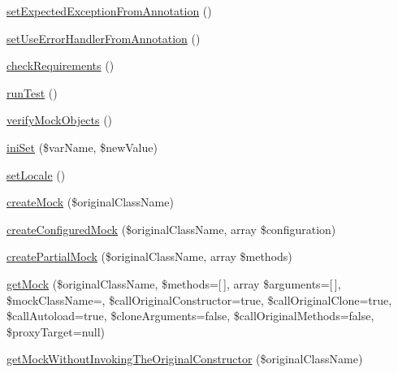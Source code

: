 \begin{DoxyCompactItemize}
\item 
\mbox{\hyperlink{class_p_h_p_unit___framework___test_case_a1f8d27bd497682c5865d7cd56637107d}{set\+Expected\+Exception\+From\+Annotation}} ()
\item 
\mbox{\hyperlink{class_p_h_p_unit___framework___test_case_aa5e8cbdf33dc3eea4fbd698aeb198dc1}{set\+Use\+Error\+Handler\+From\+Annotation}} ()
\item 
\mbox{\hyperlink{class_p_h_p_unit___framework___test_case_a675519dd67770964b90eddec9f8abe09}{check\+Requirements}} ()
\item 
\mbox{\hyperlink{class_p_h_p_unit___framework___test_case_ad2541a093be4d619db04ed65d661a684}{run\+Test}} ()
\item 
\mbox{\hyperlink{class_p_h_p_unit___framework___test_case_a11e8b1ce7043340e31f0fd2c59ee35c6}{verify\+Mock\+Objects}} ()
\item 
\mbox{\hyperlink{class_p_h_p_unit___framework___test_case_a82d7151b3bd880686e79a66c5baa583d}{ini\+Set}} (\$var\+Name, \$new\+Value)
\item 
\mbox{\hyperlink{class_p_h_p_unit___framework___test_case_a7b8ab0275f921bf96c37f4412a9d6020}{set\+Locale}} ()
\item 
\mbox{\hyperlink{class_p_h_p_unit___framework___test_case_add70f35672c920c22639c26308a644e3}{create\+Mock}} (\$original\+Class\+Name)
\item 
\mbox{\hyperlink{class_p_h_p_unit___framework___test_case_af6a81ca39f74c807f33f5efa440b219b}{create\+Configured\+Mock}} (\$original\+Class\+Name, array \$configuration)
\item 
\mbox{\hyperlink{class_p_h_p_unit___framework___test_case_a6baede145d4c976da342aff0f2483972}{create\+Partial\+Mock}} (\$original\+Class\+Name, array \$methods)
\item 
\mbox{\hyperlink{class_p_h_p_unit___framework___test_case_a482f203808f2d0db3bff64bd0b65b8d6}{get\+Mock}} (\$original\+Class\+Name, \$methods=\mbox{[}$\,$\mbox{]}, array \$arguments=\mbox{[}$\,$\mbox{]}, \$mock\+Class\+Name=\textquotesingle{}\textquotesingle{}, \$call\+Original\+Constructor=true, \$call\+Original\+Clone=true, \$call\+Autoload=true, \$clone\+Arguments=false, \$call\+Original\+Methods=false, \$proxy\+Target=null)
\item 
\mbox{\hyperlink{class_p_h_p_unit___framework___test_case_afe3a8f40182fa0a53bdfdf582d85199a}{get\+Mock\+Without\+Invoking\+The\+Original\+Constructor}} (\$original\+Class\+Name)
\item 

\end{DoxyCompactItemize}
